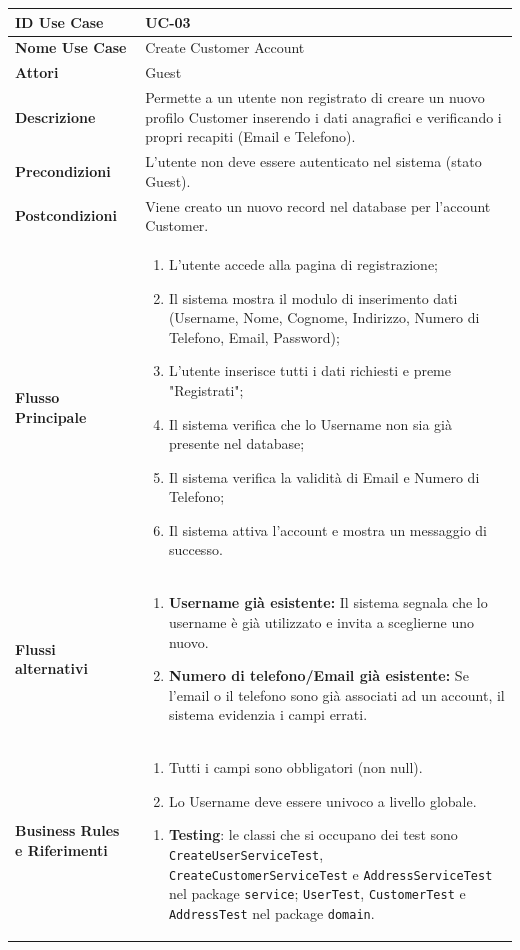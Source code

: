 \documentclass{article}
\newcommand{\usecasetable}[9]{
	\begin{table}[h!]
		\centering
		\footnotesize
		\renewcommand{\arraystretch}{1.4}
		\begin{tabularx}{\textwidth}{|l|>{\raggedright\arraybackslash}X|}
			\hline
			\textbf{ID Use Case} & #1 \\ \hline
			\textbf{Nome Use Case} & #2 \\ \hline
			\textbf{Attori} & #3 \\ \hline
			\textbf{Descrizione} & #4 \\ \hline
			\textbf{Precondizioni} & #5 \\ \hline
			\textbf{Postcondizioni} & #6 \\ \hline
			\textbf{Flusso Principale} & #7 \\ \hline
			\textbf{Flussi alternativi} & #8 \\ \hline
			\textbf{Business Rules e Riferimenti} & #9 \\ \hline
		\end{tabularx}
	\end{table}
}
\begin{document}
	\usecasetable
	{UC-03}
	{Create Customer Account}
	{Guest}
	{Permette a un utente non registrato di creare un nuovo profilo Customer inserendo i dati anagrafici e verificando i propri recapiti (Email e Telefono).}
	{L'utente non deve essere autenticato nel sistema (stato Guest).}
	{Viene creato un nuovo record nel database per l'account Customer.}
	{
		\begin{enumerate}[nosep, leftmargin=*]
			\item L'utente accede alla pagina di registrazione;
			\item Il sistema mostra il modulo di inserimento dati (Username, Nome, Cognome, Indirizzo, Numero di Telefono, Email, Password);
			\item L'utente inserisce tutti i dati richiesti e preme "Registrati";
			\item Il sistema verifica che lo Username non sia già presente nel database;
			\item Il sistema verifica la validità di Email e Numero di Telefono;
			\item Il sistema attiva l'account e mostra un messaggio di successo.
		\end{enumerate}
	}
	{
		\begin{enumerate}[nosep, leftmargin=25px]
			\item[\textbf{4a.}] \textbf{Username già esistente:} Il sistema segnala che lo username è già utilizzato e invita a sceglierne uno nuovo.
			\item[\textbf{5a.}] \textbf{Numero di telefono/Email già esistente:} Se l'email o il telefono sono già associati ad un account, il sistema evidenzia i campi errati.
		\end{enumerate}
	}
	{
		\begin{enumerate}[nosep, leftmargin=*]
			\item[•] Tutti i campi sono obbligatori (non null).
			\item[•] Lo Username deve essere univoco a livello globale.
		\end{enumerate}
		
		\begin{enumerate}[leftmargin=*]
			\item[•] \textbf{Testing}: le classi che si occupano dei test sono \texttt{CreateUserServiceTest}, \texttt{CreateCustomerServiceTest} e \texttt{AddressServiceTest} nel package \texttt{service}; \texttt{UserTest}, \texttt{CustomerTest} e \texttt{AddressTest} nel package \texttt{domain}.
		\end{enumerate}
	}
		
\end{document}

